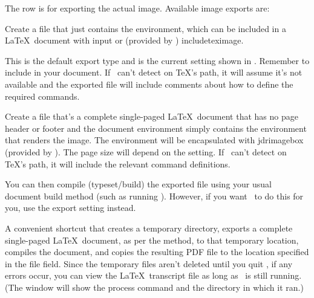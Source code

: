 The  row is for exporting the
actual image. Available image exports are:
\begin{deflist}
\begin{itemdesc}
Create a file that just contains the  environment,
which can be included in a \LaTeX\ document with \gls{input}
or (provided by ) \gls{includeteximage}.

This is the default export type and is the current setting shown in
. Remember to include 
 in your document. If \FlowframTk\ can't detect
 on \TeX's path, it will assume it's not
available and the exported file will include comments about how to
define the required commands.
\end{itemdesc}


\begin{itemdesc}
Create a file that's a complete single-paged \LaTeX\ document that
has no page header or footer and the document environment simply
contains the  environment that renders the image.
The  environment will be encapsulated with
\gls{jdrimagebox} (provided by ).
The page size will depend on the  setting.
If \FlowframTk\ can't detect  on \TeX's path,
it will include the relevant command definitions.

You can then compile (typeset/build) the exported file using your
usual document build method (such as running ).
However, if you want \FlowframTk\ to do this for you, use the 
 export setting instead.
\end{itemdesc}


\begin{itemdesc}
A convenient shortcut that creates a temporary directory, 
exports a complete single-paged \LaTeX\
document, as per the  method, to that
temporary location, compiles the document, and copies the resulting
PDF file to the location specified in the file field. Since the
temporary files aren't deleted until you quit \FlowframTk, if any
errors occur, you can view the \LaTeX\ transcript file as long as \FlowframTk\ is
still running. (The \dialog{message} window will show the process
command and the directory in which it ran.)
\end{itemdesc}


\end{deflist}
